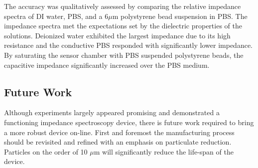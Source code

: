 \par The accuracy was qualitatively assessed by comparing the relative impedance spectra of DI water, PBS, and a 6$\mu$m polystyrene bead suspension in PBS. The impedance spectra met the expectations set by the dielectric properties of the solutions. Deionized water exhibited the largest impedance due to its high resistance and the conductive PBS responded with significantly lower impedance. By saturating the sensor chamber with PBS suspended polystyrene beads, the capacitive impedance significantly increased over the PBS medium. 




\subsection*{Future Work}

\par Although experiments largely appeared promising and demonstrated a functioning impedance spectroscopy device, there is future work required to bring a more robust device on-line. First and foremost the manufacturing process should be revisited and refined with an emphasis on particulate reduction. Particles on the order of 10 $\mu$m will significantly reduce the life-span of the device. 


